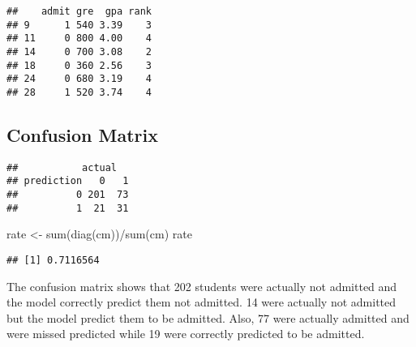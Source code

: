 \documentclass[
]{article}
\newenvironment{Shaded}{\begin{snugshade}}{\end{snugshade}}
\newcommand{\AttributeTok}[1]{\textcolor[rgb]{0.77,0.63,0.00}{#1}}
\newcommand{\DecValTok}[1]{\textcolor[rgb]{0.00,0.00,0.81}{#1}}
\newcommand{\FloatTok}[1]{\textcolor[rgb]{0.00,0.00,0.81}{#1}}
\newcommand{\FunctionTok}[1]{\textcolor[rgb]{0.00,0.00,0.00}{#1}}
\newcommand{\NormalTok}[1]{#1}
\newcommand{\OtherTok}[1]{\textcolor[rgb]{0.56,0.35,0.01}{#1}}
\newcommand{\SpecialCharTok}[1]{\textcolor[rgb]{0.00,0.00,0.00}{#1}}
\begin{document}
\begin{verbatim}
##    admit gre  gpa rank
## 9      1 540 3.39    3
## 11     0 800 4.00    4
## 14     0 700 3.08    2
## 18     0 360 2.56    3
## 24     0 680 3.19    4
## 28     1 520 3.74    4
\end{verbatim}

\hypertarget{confusion-matrix}{%
\subsection{Confusion Matrix}\label{confusion-matrix}}

\begin{Shaded}
\end{Shaded}

\begin{verbatim}
##           actual
## prediction   0   1
##          0 201  73
##          1  21  31
\end{verbatim}

\begin{Shaded}
\begin{Highlighting}[]
\NormalTok{rate }\OtherTok{\textless{}{-}} \FunctionTok{sum}\NormalTok{(}\FunctionTok{diag}\NormalTok{(cm))}\SpecialCharTok{/}\FunctionTok{sum}\NormalTok{(cm)}
\NormalTok{rate}
\end{Highlighting}
\end{Shaded}

\begin{verbatim}
## [1] 0.7116564
\end{verbatim}

The confusion matrix shows that 202 students were actually not admitted
and the model correctly predict them not admitted. 14 were actually not
admitted but the model predict them to be admitted. Also, 77 were
actually admitted and were missed predicted while 19 were correctly
predicted to be admitted.
\end{document}

